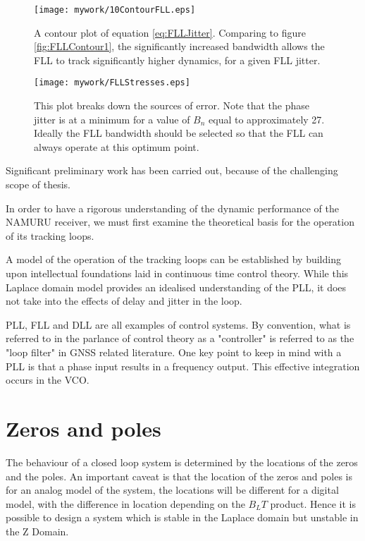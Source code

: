 \begin{figure}[!htb] 
    \centering
    \texttt{[image: mywork/10ContourFLL.eps]} 
    \caption{A contour plot of equation \ref{eq:FLLJitter}. Comparing to figure \ref{fig:FLLContour1}, the significantly increased bandwidth allows the FLL to track significantly higher dynamics, for a given FLL jitter.}
\end{figure}



\begin{figure}[!htb] 
    \centering
    \texttt{[image: mywork/FLLStresses.eps]} 
    \caption{This plot breaks down the sources of error. Note that the phase jitter is at a minimum for a value of $B_n$ equal to approximately 27. Ideally the FLL bandwidth should be selected so that the FLL can always operate at this optimum point.}
\end{figure}



Significant preliminary work has been carried out, because of the challenging scope of thesis. 

In order to have a rigorous understanding of the dynamic performance of the \ac{NAMURU} receiver, we must first examine the theoretical basis for the operation of its tracking loops. 

A model of the operation of the tracking loops can be established by building upon intellectual foundations laid in continuous time control theory. While this Laplace domain model provides an idealised understanding of the \ac{PLL}, it does not take into the effects of delay and jitter in the loop. 

\ac{PLL}, \ac{FLL} and \ac{DLL} are all examples of control systems. By convention, what is referred to in the parlance of control theory as a "controller" is referred to as the "loop filter" in \ac{GNSS} related literature. One key point to keep in mind with a \ac{PLL} is that a phase input results in a frequency output. This effective integration occurs in the \ac{VCO}.

\section{Zeros and poles}
The behaviour of a closed loop system is determined by the locations of the zeros and the poles. An important caveat is that the location of the zeros and poles is for an analog model of the system, the locations will be different for a digital model, with the difference in location depending on the $B_LT$ product.  Hence it is possible to design a system which is stable in the Laplace domain but unstable in the Z Domain. 

